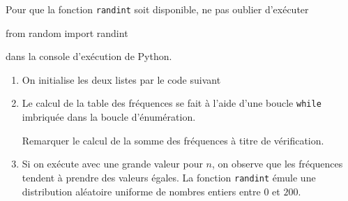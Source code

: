 Pour que la fonction \texttt{randint} soit disponible, ne pas oublier d'exécuter
\begin{center}
  from random import randint
\end{center}
dans la console d'exécution de Python.
\begin{enumerate}
  \item On initialise les deux listes par le code suivant

  \item Le calcul de la table des fréquences se fait à l'aide d'une boucle \texttt{while} imbriquée dans la boucle d'énumération.

Remarquer le calcul de la somme des fréquences à titre de vérification.
  \item Si on exécute avec une grande valeur pour $n$, on observe que les fréquences tendent à prendre des valeurs égales. La fonction \texttt{randint} émule une distribution aléatoire uniforme de nombres entiers entre $0$ et $200$.
\end{enumerate}
